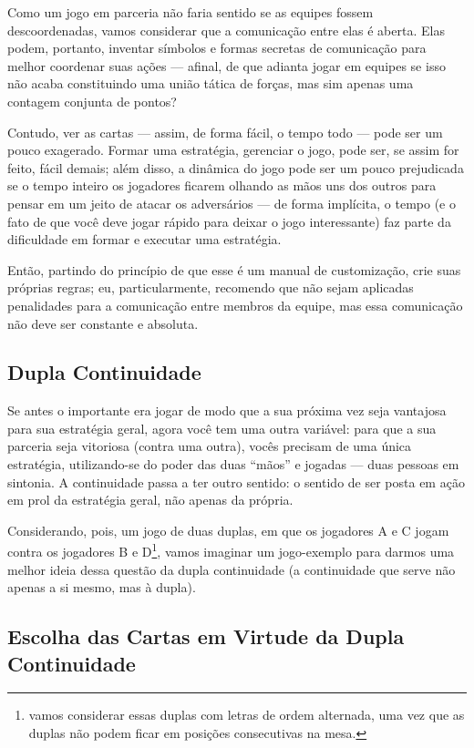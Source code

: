 Como um jogo em parceria não faria sentido se as equipes fossem descoordenadas, vamos considerar que a comunicação entre elas é aberta. Elas podem, portanto, inventar símbolos e formas secretas de comunicação para melhor coordenar suas ações --- afinal, de que adianta jogar em equipes se isso não acaba constituindo uma união tática de forças, mas sim apenas uma contagem conjunta de pontos?

Contudo, ver as cartas --- assim, de forma fácil, o tempo todo --- pode ser um pouco exagerado. Formar uma estratégia, gerenciar o jogo, pode ser, se assim for feito, fácil demais; além disso, a dinâmica do jogo pode ser um pouco prejudicada se o tempo inteiro os jogadores ficarem olhando as mãos uns dos outros para pensar em um jeito de atacar os adversários --- de forma implícita, o tempo (e o fato de que você deve jogar rápido para deixar o jogo interessante) faz parte da dificuldade em formar e executar uma estratégia.

Então, partindo do princípio de que esse é um manual de customização, crie suas próprias regras; eu, particularmente, recomendo que não sejam aplicadas penalidades para a comunicação entre membros da equipe, mas essa comunicação não deve ser constante e absoluta.

\subsection{Dupla Continuidade}

Se antes o importante era jogar de modo que a sua próxima vez seja vantajosa para sua estratégia geral, agora você tem uma outra variável: para que a sua parceria seja vitoriosa (contra uma outra), vocês precisam de uma única estratégia, utilizando-se do poder das duas ``mãos'' e jogadas --- duas pessoas em sintonia. A continuidade passa a ter outro sentido: o sentido de ser posta em ação em prol da estratégia geral, não apenas da própria.

Considerando, pois, um jogo de duas duplas, em que os jogadores A e C jogam contra os jogadores B e D\footnote{vamos considerar essas duplas com letras de ordem alternada, uma vez que as duplas não podem ficar em posições consecutivas na mesa.}, vamos imaginar um jogo-exemplo para darmos uma melhor ideia dessa questão da dupla continuidade (a continuidade que serve não apenas a si mesmo, mas à dupla).

\subsection{Escolha das Cartas em Virtude da Dupla Continuidade}

